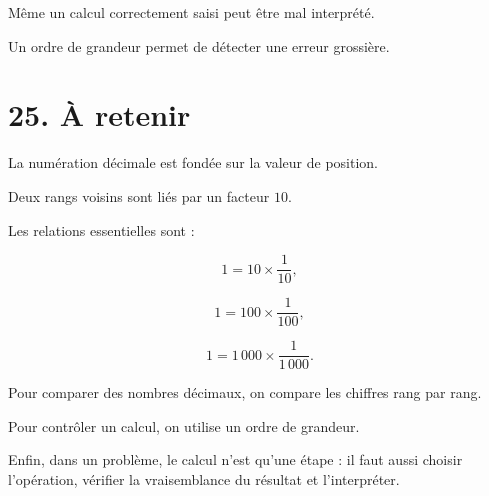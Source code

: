 Même un calcul correctement saisi peut être mal interprété.

Un ordre de grandeur permet de détecter une erreur grossière.

\section{25. À retenir}

La numération décimale est fondée sur la valeur de position.

Deux rangs voisins sont liés par un facteur $10$.

Les relations essentielles sont :

\[
1=10\times\dfrac{1}{10},
\]

\[
1=100\times\dfrac{1}{100},
\]

\[
1=1\,000\times\dfrac{1}{1\,000}.
\]

Pour comparer des nombres décimaux, on compare les chiffres rang par rang.

Pour contrôler un calcul, on utilise un ordre de grandeur.

Enfin, dans un problème, le calcul n’est qu’une étape : il faut aussi choisir l’opération, vérifier la vraisemblance du résultat et l’interpréter.
